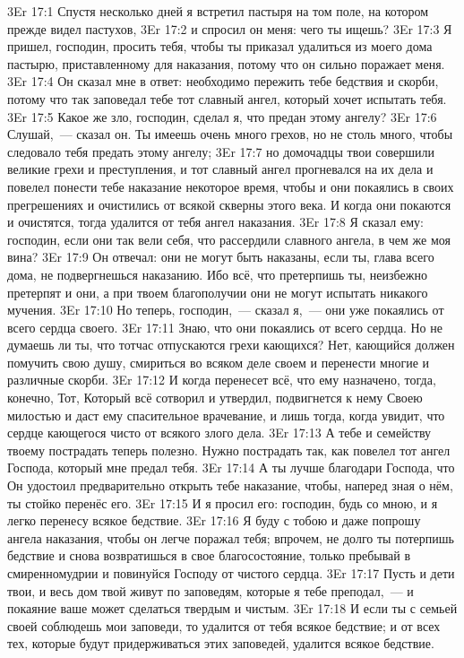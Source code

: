 \vs 3Er 17:1
Спустя несколько дней я встретил пастыря на том поле, на
котором прежде видел пастухов,
\vs 3Er 17:2
и спросил он меня: чего ты
ищешь?
\vs 3Er 17:3
Я пришел, господин,
просить тебя, чтобы ты приказал удалиться из моего дома пастырю,
приставленному для наказания, потому что он сильно поражает меня.
\vs 3Er 17:4
Он сказал мне в ответ:
необходимо пережить тебе бедствия и скорби, потому что так заповедал тебе тот
славный ангел, который хочет испытать тебя.
\vs 3Er 17:5
Какое же зло, господин,
сделал я, что предан этому ангелу?
\vs 3Er 17:6
Слушай,~--- сказал он. Ты
имеешь очень много грехов, но не столь много, чтобы следовало тебя предать
этому ангелу;
\vs 3Er 17:7
но домочадцы твои
совершили великие грехи и преступления, и тот славный ангел прогневался на их
дела и повелел понести тебе наказание некоторое время, чтобы и они покаялись в
своих прегрешениях и очистились от всякой скверны этого века. И когда они
покаются и очистятся, тогда удалится от тебя ангел наказания.
\vs 3Er 17:8
Я сказал ему: господин,
если они так вели себя, что рассердили славного ангела, в чем же моя вина?
\vs 3Er 17:9
Он отвечал: они не могут
быть наказаны, если ты, глава всего дома, не подвергнешься наказанию. Ибо всё,
что претерпишь ты, неизбежно претерпят и они, а при твоем благополучии они не
могут испытать никакого мучения.
\vs 3Er 17:10
Но теперь, господин,~--- сказал я,~--- они уже покаялись от всего сердца своего.
\vs 3Er 17:11
Знаю, что они покаялись
от всего сердца. Но не думаешь ли ты, что тотчас отпускаются грехи кающихся?
Нет, кающийся должен помучить свою душу, смириться во всяком деле своем и
перенести многие и различные скорби.
\vs 3Er 17:12
И когда перенесет всё,
что ему назначено, тогда, конечно, Тот, Который всё сотворил и утвердил,
подвигнется к нему Своею милостью и даст ему спасительное врачевание, и лишь
тогда, когда увидит, что сердце кающегося чисто от всякого злого дела.
\vs 3Er 17:13
А тебе и семейству твоему
пострадать теперь полезно. Нужно пострадать так, как повелел тот ангел
Господа, который мне предал тебя.
\vs 3Er 17:14
А ты лучше благодари
Господа, что Он удостоил предварительно открыть тебе наказание, чтобы, наперед
зная о нём, ты стойко перенёс его.
\vs 3Er 17:15
И я просил его: господин,
будь со мною, и я легко перенесу всякое бедствие.
\vs 3Er 17:16
Я буду с тобою и даже
попрошу ангела наказания, чтобы он легче поражал тебя; впрочем, не долго ты
потерпишь бедствие и снова возвратишься в свое благосостояние, только пребывай
в смиренномудрии и повинуйся Господу от чистого сердца.
\vs 3Er 17:17
Пусть и дети твои, и весь
дом твой живут по заповедям, которые я тебе преподал,~--- и покаяние ваше может
сделаться твердым и чистым.
\vs 3Er 17:18
И если ты с семьей своей
соблюдешь мои заповеди, то удалится от тебя всякое бедствие; и от всех тех,
которые будут придерживаться этих заповедей, удалится всякое бедствие.

